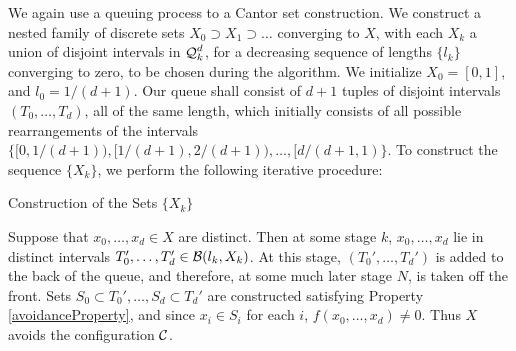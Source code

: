 We again use a queuing process to a Cantor set construction. We construct a nested family of discrete sets $X_0 \supset X_1 \supset \dots$ converging to $X$, with each $X_k$ a union of disjoint intervals in $\operatorname{\mathcal{Q}}_k^d$, for a decreasing sequence of lengths $\{ l_k \}$ converging to zero, to be chosen during the algorithm. We initialize $X_0 = [0,1]$, and $l_0 = 1/(d+1)$. Our queue shall consist of $d+1$ tuples of disjoint intervals $(T_0, \dots, T_d)$, all of the same length, which initially consists of all possible rearrangements of the intervals $\{ [0,1/(d+1)), [1/(d+1),2/(d+1)), \dots, [d/(d+1, 1) \}$. To construct the sequence $\{ X_k \}$, we perform the following iterative procedure:
%
\begin{algorithm}[H]
    \begin{algorithmic}
        \caption{Construction of the Sets $\{ X_k \}$}
        \MRepeat
        \EndRepeat   
    \end{algorithmic}
\end{algorithm}

Suppose that $x_0, \dots, x_d \in X$ are distinct. Then at some stage $k$, $x_0, \dots, x_d$ lie in distinct intervals $T_0', \dots, T_d' \in \operatorname{\mathcal{B}}(l_k,X_k)$. At this stage, $(T_0', \dots, T_d')$ is added to the back of the queue, and therefore, at some much later stage $N$, is taken off the front. Sets $S_0 \subset T_0', \dots, S_d \subset T_d'$ are constructed satisfying Property \ref{avoidanceProperty}, and since $x_i \in S_i$ for each $i$, $f(x_0, \dots, x_d) \neq 0$. Thus $X$ avoids the configuration $\operatorname{\mathcal{C}}$.

